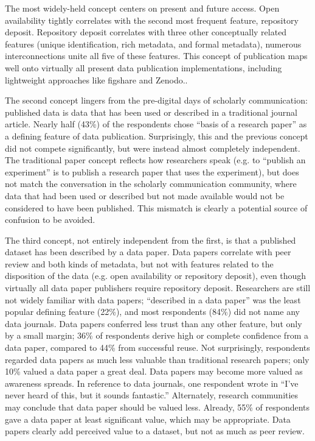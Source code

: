 \documentclass[10pt]{article}
\begin{document}
The most widely-held concept centers on present and future access.
Open availability tightly correlates with the second most frequent feature, repository deposit.
Repository deposit correlates with three other conceptually related features (unique identification, rich metadata, and formal metadata), numerous interconnections unite all five of these features.
This concept of publication maps well onto virtually all present data publication implementations, including lightweight approaches like figshare and Zenodo..

The second concept lingers from the pre-digital days of scholarly communication: published data is data that has been used or described in a traditional journal article. 
Nearly half (43\%) of the respondents chose ``basis of a research paper'' as a defining feature of data publication. 
Surprisingly, this and the previous concept did not compete significantly, but were instead almost completely independent.
The traditional paper concept reflects how researchers speak (e.g. to ``publish an experiment'' is to publish a research paper that uses the experiment), but does not match the conversation in the scholarly communication community, where data that had been used or described but not made available would not be considered to have been published.
This mismatch is clearly a potential source of confusion to be avoided.

The third concept, not entirely independent from the first, is that a published dataset has been described by a data paper.
Data papers correlate with peer review and both kinds of metadata, but not with features related to the disposition of the data (e.g. open availability or repository deposit), even though virtually all data paper publishers require repository deposit.
Researchers are still not widely familiar with data papers; ``described in a data paper'' was the least popular defining feature (22\%), and most respondents (84\%) did not name any data journals.
Data papers conferred less trust than any other feature, but only by a small margin; 36\% of respondents derive high or complete confidence from a data paper, compared to 44\% from successful reuse.
Not surprisingly, respondents regarded data papers as much less valuable than traditional research papers; only 10\% valued a data paper a great deal. %
Data papers may become more valued as awareness spreads.
In reference to data journals, one respondent wrote in ``I've never heard of this, but it sounds fantastic.''
Alternately, research communities may conclude that data paper should be valued less.
Already, 55\% of respondents gave a data paper at least significant value, which may be appropriate.
Data papers clearly add perceived value to a dataset, but not as much as peer review.
 
\end{document}
